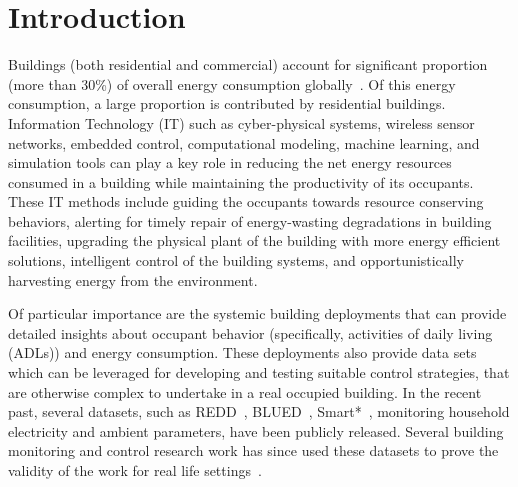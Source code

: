 \documentclass[10pt]{sensys-proc}
\begin{document}
\section{Introduction}
\label{sec:intro}
 Buildings (both residential and commercial) account for significant proportion (more than 30\%) of overall energy consumption globally~\cite{evans09india}. %
Of this energy consumption, a large proportion is contributed by residential buildings. %
Information Technology (IT) such as cyber-physical systems, wireless sensor networks, embedded control, computational modeling, machine learning, and simulation tools can play a key role in reducing the net energy resources consumed in a building while maintaining the productivity of its occupants. These IT methods include guiding the occupants towards resource conserving behaviors, alerting for timely repair of energy-wasting degradations in building facilities, upgrading the physical plant of the building with more energy efficient solutions, intelligent control of the building systems, and opportunistically harvesting energy from the environment.
 
 Of particular importance are the systemic building deployments that can provide detailed insights about occupant behavior (specifically, activities of daily living (ADLs)) and energy consumption. These deployments also provide data sets which can be leveraged for developing and testing suitable control strategies, that are otherwise complex to undertake in a real occupied building. In the recent past, several datasets, such as REDD~\cite{redd}, BLUED~\cite{blued_cmu}, Smart*~\cite{smart}, monitoring household electricity and ambient parameters, have been publicly released. Several building monitoring and control research work has since used these datasets to prove the validity of the work for real life settings~\cite{parson2012_aaai,smartcap}.  
\end{document}
